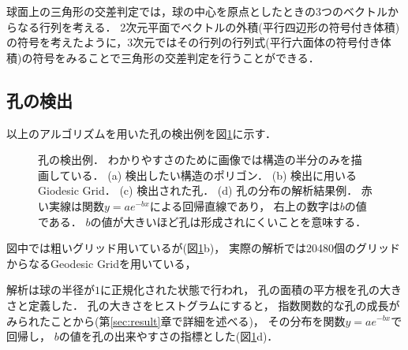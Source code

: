 球面上の三角形の交差判定では，球の中心を原点としたときの3つのベクトルからなる行列を考える．
2次元平面でベクトルの外積(平行四辺形の符号付き体積)の符号を考えたように，3次元ではその行列の行列式(平行六面体の符号付き体積)の符号をみることで三角形の交差判定を行うことができる．


\subsection{孔の検出}
以上のアルゴリズムを用いた孔の検出例を図\ref{fig:hole_detection}に示す．
\begin{figure}
    \centering
    
    \caption{
        孔の検出例．
        わかりやすさのために画像では構造の半分のみを描画している．
        (a) 検出したい構造のポリゴン．
        (b) 検出に用いるGiodesic Grid．
        (c) 検出された孔．
        (d) 孔の分布の解析結果例．
            赤い実線は関数$y=ae^{-bx}$による回帰直線であり，
            右上の数字は$b$の値である．
            $b$の値が大きいほど孔は形成されにくいことを意味する．
    }
    \label{fig:hole_detection}
\end{figure}
図中では粗いグリッド用いているが(図\ref{fig:hole_detection}b)，
実際の解析では20480個のグリッドからなるGeodesic Gridを用いている，

解析は球の半径が$1$に正規化された状態で行われ，
孔の面積の平方根を孔の大きさと定義した．
孔の大きさをヒストグラムにすると，
指数関数的な孔の成長がみられたことから(第\ref{sec:result}章で詳細を述べる)，
その分布を関数$y=ae^{-bx}$で回帰し，
$b$の値を孔の出来やすさの指標とした(図\ref{fig:hole_detection}d)．
